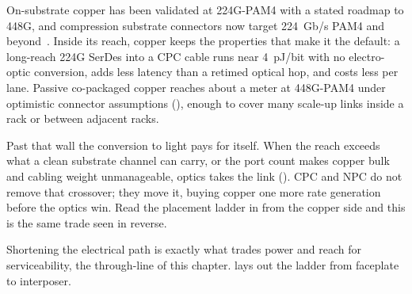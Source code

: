 On-substrate copper has been validated at 224G-PAM4 with a stated roadmap to 448G,
and compression substrate connectors now target 224~Gb/s PAM4 and
beyond~. Inside its reach, copper keeps the properties that make it the
default: a long-reach 224G SerDes into a CPC cable runs near 4~pJ/bit with no
electro-optic conversion, adds less latency than a retimed optical hop, and costs less
per lane. Passive co-packaged copper reaches about a meter at 448G-PAM4 under
optimistic connector assumptions (), enough to cover many scale-up
links inside a rack or between adjacent racks.

Past that wall the conversion to light pays for itself. When the reach exceeds what a
clean substrate channel can carry, or the port count makes copper bulk and cabling
weight unmanageable, optics takes the link (). CPC and NPC do not
remove that crossover; they move it, buying copper one more rate generation before the
optics win. Read the placement ladder in  from the copper side and
this is the same trade seen in reverse.

 Shortening the electrical path is exactly
what trades power and reach for serviceability, the through-line of this chapter.
 lays out the ladder from faceplate to interposer.

